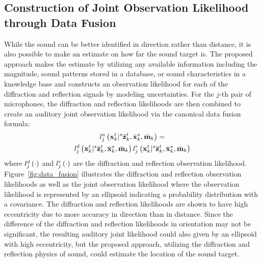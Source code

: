 \documentclass[letterpaper, 10 pt, conference]{ieeeconf}  %
\begin{document}
\subsection{ Construction of Joint Observation Likelihood through Data Fusion} 
While the sound can be better identified in direction rather than distance, it is also possible to make an estimate on how far the sound target is.  The proposed approach makes the estimate by utilizing any available information including the magnitude, sound patterns stored in a database, or sound characteristics in a knowledge base and constructs an observation likelihood for each of the diffraction and reflection signals by modeling uncertainties.  For the $j$-th pair of microphones, the diffraction and reflection likelihoods are then combined to create an auditory joint observation likelihood via the canonical data fusion formula: 
\begin{multline}\label{eq:joint_auditory}
l_j^{a} \left ( \mathbf{x}_{k}^{t}|{}^{s}\tilde {\mathbf{z}}_{k}^{t},\bar {\mathbf{x}}_{k}^{s},\bar {\mathbf{m}}_{k} \right ) = \\ l_j^{d} \left ( \mathbf{x}_{k}^{t}|{}^{s}\tilde {\mathbf{z}}_{k}^{t},\bar {\mathbf{x}}_{k}^{s},\bar {\mathbf{m}}_{k} \right ) l_j^{r} \left ( \mathbf{x}_{k}^{t}|{}^{s}\tilde {\mathbf{z}}_{k}^{t},\bar {\mathbf{x}}_{k}^{s},\bar {\mathbf{m}}_{k} \right ) 
\end{multline}
where $l_j^{d} \left ( \cdot \right )$ and $l_j^{r} \left ( \cdot \right )$ are the diffraction and reflection observation likelihood.  
Figure~\ref{fig:data_fusion} illustrates the diffraction and reflection observation likelihoods as well as the joint observation likelihood where the observation likelihood is represented by an ellipsoid indicating a probability distribution with a covariance.  The diffraction and reflection likelihoods are shown to have high eccentricity due to more accuracy in direction than in distance.  Since the difference of the diffraction and reflection likelihoods in orientation may not be significant, the resulting auditory joint likelihood could also given by an ellipsoid with high eccentricity, but the proposed approach, utilizing the diffraction and reflection physics of sound, could estimate the location of the sound target.  


\end{document}
